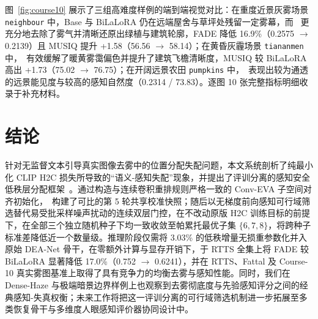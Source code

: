 \documentclass[10pt,twocolumn,letterpaper]{article}
\begin{document}
图~\ref{fig:course10} 展示了三组高难度样例的端到端视觉对比：在重度近景灰雾场景 \texttt{neighbour} 中，Base 与 BiLaLoRA 仍在远端屋舍与草坪处残留一定雾幕，而 \method~更充分地去除了雾气并清晰还原出绿植与建筑轮廓，FADE 降低 16.9\%（0.2575 $\to$ 0.2139）且 MUSIQ 提升 +1.58（56.56 $\to$ 58.14）；在黄昏灰霾场景 \texttt{tiananmen} 中，\method~有效缓解了暖黄雾霭偏色并提升了建筑飞檐清晰度，MUSIQ 较 BiLaLoRA 高出 +1.73（75.02 $\to$ 76.75）；在开阔远景农田 \texttt{pumpkins} 中，\method~表现出较为通透的远景能见度与较高的感知自然度（0.2314 / 73.83）。逐图 10 张完整指标明细收录于补充材料。

\section{结论}
针对无监督文本引导真实图像去雾中的位置分配失配问题，本文系统剖析了纯最小化 CLIP H2C 损失所导致的“语义-感知失配”现象，并提出了评训分离的感知安全低秩层分配框架~\method。通过构造与连续卷积重排规则严格一致的 Conv-EVA 子空间对齐初始化，\method~构建了可比的第 5 轮共享校准快照；随后以无梯度前向感知可行域筛选替代易受批采样噪声扰动的连续双层门控，在不改动原版 H2C 训练目标的前提下，在全部三个独立随机种子下均一致收敛至帕累托最优子集 $\{6,7,8\}$，将跨种子标准差降低近一个数量级。推理阶段仅需将 3.03\% 的低秩增量无损重参数化并入原始 DEA-Net 骨干，在零额外计算与显存开销下，于 RTTS 全集上将 FADE 较 BiLaLoRA 显著降低 17.0\%（0.752 $\to$ 0.6241），并在 RTTS、Fattal 及 Course-10 真实雾图基准上取得了具有竞争力的均衡去雾与感知性能。同时，我们在 Dense-Haze 与极端暗景边界样例上也观察到去雾彻底度与先验感知评分之间的经典感知-失真权衡；未来工作将把这一评训分离的可行域筛选机制进一步拓展至多类恢复骨干与多维度人眼感知评价器协同设计中。

\FloatBarrier
{\small{}}
\end{document}
